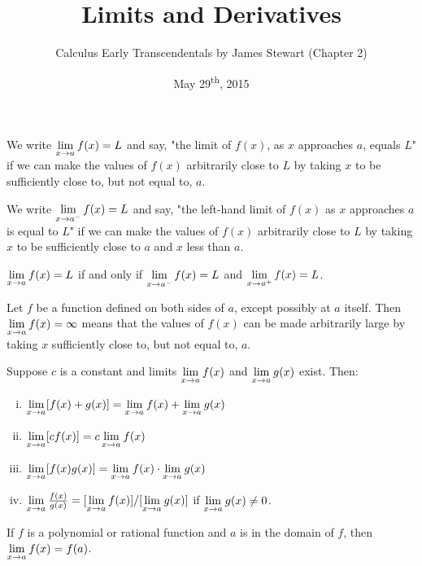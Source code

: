 \documentclass[a4paper,11pt]{article}
\title{Limits and Derivatives}
\author{Calculus Early Transcendentals by James Stewart (Chapter 2)}
\date{May 29\textsuperscript{th}, 2015}
\begin{document}
\maketitle
{}

\begin{outline}

    We write \(\xlimit{x}{a} f(x)=L\) and say, "the limit of \(f(x)\), as \(x\) approaches
    \(a\), equals \(L\)" if we can make the values of \(f(x)\) arbitrarily close to \(L\) by taking \(x\) 
    to be sufficiently close to, but not equal to, \(a\).
    
    We write \(\xlimit[-]{x}{a} f(x)=L\) and say, "the left-hand limit of \(f(x)\) as \(x\)
    approaches \(a\) is equal to \(L\)" if we can make the values of \(f(x)\) arbitrarily close to \(L\) by
    taking \(x\) to be sufficiently close to \(a\) and \(x\) less than \(a\).
    
    \(\xlimit{x}{a} f(x) = L\) if and only if \(\xlimit[-]{x}{a} f(x) = L\)
    and \(\xlimit[+]{x}{a} f(x) = L\).
    
    Let \(f\) be a function defined on both sides of \(a\), except possibly at \(a\) itself. Then
    \(\xlimit{x}{a} f(x) = \infty\) means that the values of \(f(x)\) can be made arbitrarily large 
    by taking \(x\) sufficiently close to, but not equal to, \(a\).
    
    Suppose \(c\) is a constant and limits \(\xlimit{x}{a} f(x)\) and \(\xlimit{x}{a} g(x)\) exist. Then:
    \begin{enumerate}[i.]
      \item 
        \(\xlimit{x}{a} [f(x) + g(x)] = \xlimit{x}{a} f(x) + \xlimit{x}{a} g(x)\)
      \item
        \(\xlimit{x}{a} [cf(x)] = c \xlimit{x}{a} f(x)\)
      \item
        \(\xlimit{x}{a} [f(x)g(x)] = \xlimit{x}{a} f(x) \cdot \xlimit{x}{a} g(x)\)
      \item
        \(\xlimit{x}{a} \frac{f(x)}{g(x)} = [\xlimit{x}{a}f(x)]/[\xlimit{x}{a}g(x)]\) if
        \(\xlimit{x}{a}g(x) \neq 0\).
    \end{enumerate}
    
    If \(f\) is a polynomial or rational function and \(a\) is in the domain of \(f\), then
    \(\xlimit{x}{a} f(x) = f(a)\).
    

\end{outline}
\end{document}
